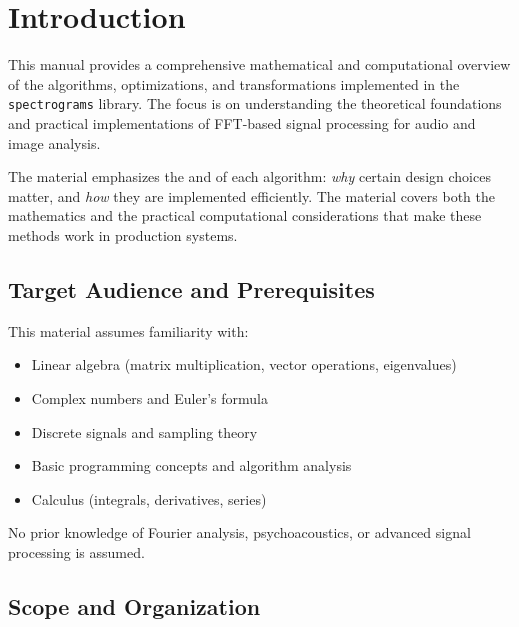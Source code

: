 
\section{Introduction}\label{sec:introduction}

This manual provides a comprehensive mathematical and computational
overview of the algorithms, optimizations, and transformations
implemented in the \texttt{spectrograms} library. The focus is on
understanding the theoretical foundations and practical
implementations of FFT-based signal processing for audio and image analysis.

The material emphasizes the  and  of each
algorithm: \emph{why} certain design choices matter, and \emph{how}
they are implemented efficiently. The material covers both the
mathematics and the practical computational considerations that make
these methods work in production systems.

\subsection{Target Audience and Prerequisites}\label{subsec:prerequisites}

This material assumes familiarity with:
\begin{itemize}[itemsep=3pt]
  \item Linear algebra (matrix multiplication, vector operations, eigenvalues)
  \item Complex numbers and Euler's formula
  \item Discrete signals and sampling theory
  \item Basic programming concepts and algorithm analysis
  \item Calculus (integrals, derivatives, series)
\end{itemize}

No prior knowledge of Fourier analysis, psychoacoustics, or advanced
signal processing is assumed.

\subsection{Scope and Organization}\label{subsec:organization}

